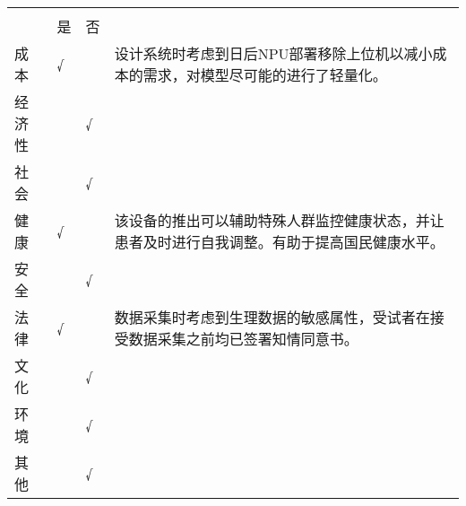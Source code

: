 \begin{thesisntfa}
    \flushleft
    \renewcommand\arraystretch{1.8}
    \begin{longtable}{p{1.78cm}|p{1.27cm}|p{1.27cm}|p{8.46cm}}
        \hline
         &  &  \\
        \rule{0pt}{1cm} & 是 & 否 & \\
        \hline
        \endhead
        成本 & √ &  & 设计系统时考虑到日后NPU部署移除上位机以减小成本的需求，对模型尽可能的进行了轻量化。 \\
        \hline
        经济性 &  & √ &  \\
        \hline
        社会 &  & √ & \\
        \hline
        健康 & √ &  & 该设备的推出可以辅助特殊人群监控健康状态，并让患者及时进行自我调整。有助于提高国民健康水平。 \\
        \hline
        安全 &  & √ & \\
        \hline
        法律 & √ &  & 数据采集时考虑到生理数据的敏感属性，受试者在接受数据采集之前均已签署知情同意书。\\
        \hline
        文化 &  & √ & \\
        \hline
        环境 &  & √ & \\
        \hline
        其他 &  & √ & \\
        \hline
    \end{longtable}
\end{thesisntfa}